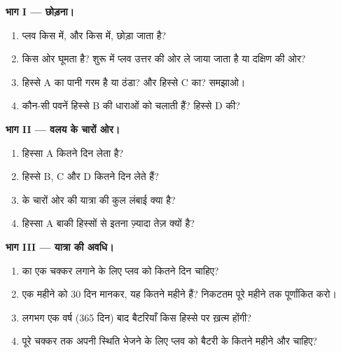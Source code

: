 \begin{problem}
\noindent\textbf{भाग I --- छोड़ना।}\par\nopagebreak
\begin{enumerate}[beginpenalty=10000]
  \item प्लव किस  में, और किस  में, छोड़ा जाता है?
  \item {} किस ओर घूमता है? शुरू में प्लव उत्तर की ओर ले जाया जाता है या दक्षिण की
        ओर?
  \item हिस्से A का पानी गरम है या ठंडा? और हिस्से C का? समझाओ।
  \item कौन-सी पवनें हिस्से B की धाराओं को चलाती हैं? हिस्से D की?
\end{enumerate}

\noindent\textbf{भाग II --- वलय के चारों ओर।}\par\nopagebreak
\begin{enumerate}[resume, beginpenalty=10000]
  \item हिस्सा A कितने दिन लेता है?
  \item हिस्से B, C और D कितने दिन लेते हैं?
  \item {} के चारों ओर की यात्रा की कुल लंबाई क्या है?
  \item हिस्सा A बाकी हिस्सों से इतना ज़्यादा तेज़ क्यों है?
\end{enumerate}

\noindent\textbf{भाग III --- यात्रा की अवधि।}\par\nopagebreak
\begin{enumerate}[resume, beginpenalty=10000]
  \item {} का एक चक्कर लगाने के लिए प्लव को कितने दिन चाहिए?
  \item एक महीने को 30 दिन मानकर, यह कितने महीने हैं? निकटतम पूरे महीने तक
        पूर्णांकित करो।
  \item लगभग एक वर्ष (365 दिन) बाद बैटरियाँ किस हिस्से पर ख़त्म होंगी?
  \item पूरे चक्कर तक अपनी स्थिति भेजने के लिए प्लव को बैटरी के कितने महीने और
        चाहिए?
\end{enumerate}
\end{problem}
